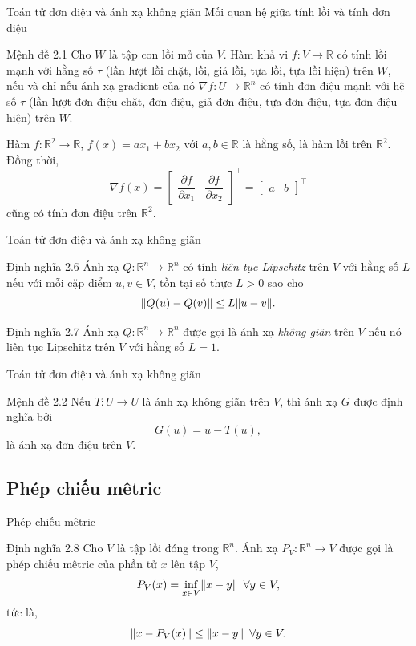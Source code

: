 \documentclass[aspectratio=169]{beamer}
\DeclarePairedDelimiter{\norm}{\lVert}{\rVert}
\theoremstyle{plain}
\theoremstyle{definition}
\theoremstyle{remark}
\begin{document}
\begin{frame}{Toán tử đơn điệu và ánh xạ không giãn}
Mối quan hệ giữa tính lồi và tính đơn điệu
\begin{block}{Mệnh đề 2.1}
    Cho $W$ là tập con lồi mở của $V$. Hàm khả vi $f: V\to\mathbb{R}$ có tính lồi mạnh với hằng số $\tau$ (lần lượt lồi chặt, lồi, giả lồi, tựa lồi, tựa lồi hiện) trên $W$, nếu và chỉ nếu ánh xạ gradient của nó $\nabla f: U\to\mathbb{R}^n$ có tính đơn điệu mạnh với hệ số $\tau$ (lần lượt đơn điệu chặt, đơn điệu, giả đơn điệu, tựa đơn điệu, tựa đơn điệu hiện) trên $W$.
\end{block}
Hàm $f:\mathbb{R}^2\to\mathbb{R}$, $f(x)=ax_1+bx_2$ với $a,b\in\mathbb{R}$ là hằng số, là hàm lồi trên $\mathbb{R}^2$. Đồng thời, $$
\nabla f(x) = \begin{bmatrix}
\dfrac{\partial f}{\partial x_1} & \dfrac{\partial f}{\partial x_2}
\end{bmatrix}^\top
=\begin{bmatrix}
a & b
\end{bmatrix}^\top
$$
cũng có tính đơn điệu trên $\mathbb{R}^2$.
\end{frame}

\begin{frame}{Toán tử đơn điệu và ánh xạ không giãn}
\begin{block}{Định nghĩa 2.6}
    Ánh xạ $Q: \mathbb{R}^n\to\mathbb{R}^n$ có tính \textit{liên tục Lipschitz} trên $V$ với hằng số $L$ nếu với mỗi cặp điểm $u,v\in V$, tồn tại số thực $L>0$ sao cho
	$$
	\norm{Q(u)-Q(v)}\leq L\norm{u-v}.
	$$
\end{block}
\begin{block}{Định nghĩa 2.7}
    Ánh xạ $Q: \mathbb{R}^n\to\mathbb{R}^n$ được gọi là ánh xạ \textit{không giãn} trên $V$ nếu nó liên tục Lipschitz trên $V$ với hằng số $L=1$.
\end{block}
\end{frame}

\begin{frame}{Toán tử đơn điệu và ánh xạ không giãn}
\begin{block}{Mệnh đề 2.2}
    Nếu $T: U\to U$ là ánh xạ không giãn trên $V$, thì ánh xạ $G$ được định nghĩa bởi 
	\begin{equation}
	G(u)=u-T(u), 
	\label{1.6}    
	\end{equation}
	là ánh xạ đơn điệu trên $V$.
\end{block}
\end{frame}

\subsection{Phép chiếu mêtric}
\begin{frame}{Phép chiếu mêtric}\pause
\begin{block}{Định nghĩa 2.8}
    Cho $V$ là tập lồi đóng trong $\mathbb{R}^n$. Ánh xạ $P_V: \mathbb{R}^n\to V$ được gọi là phép chiếu mêtric của phần tử $x$ lên tập $V$, 
    $$
    P_V(x) = \inf_{x\in V}\norm{x-y}\enskip\forall y\in V,
    $$
    tức là,
    $$
    \norm{x-P_V(x)}\leq\norm{x-y}\enskip\forall y\in V.
    $$
\end{block}
\end{frame}
\end{document}

